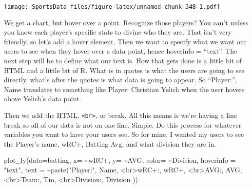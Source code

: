 \documentclass[
]{book}
\newenvironment{Shaded}{\begin{snugshade}}{\end{snugshade}}
\newcommand{\AttributeTok}[1]{\textcolor[rgb]{0.77,0.63,0.00}{#1}}
\newcommand{\FunctionTok}[1]{\textcolor[rgb]{0.00,0.00,0.00}{#1}}
\newcommand{\NormalTok}[1]{#1}
\newcommand{\SpecialCharTok}[1]{\textcolor[rgb]{0.00,0.00,0.00}{#1}}
\newcommand{\StringTok}[1]{\textcolor[rgb]{0.31,0.60,0.02}{#1}}
\begin{document}
\texttt{[image: SportsData\_files/figure-latex/unnamed-chunk-348-1.pdf]}

We get a chart, but hover over a point. Recognize those players? You can't unless you know each player's specific stats to divine who they are. That isn't very friendly, so let's add a hover element. Then we want to specify what we want our users to see when they hover over a data point, hence hoverinfo = ``text''. The next step will be to define what our text is. How that gets done is a little bit of HTML and a little bit of R. What is in quotes is what the users are going to see directly, what's after the quotes is what data is going to appear. So ``Player:'', Name translates to something like Player: Christian Yelich when the user hovers above Yelich's data point.

Then we add the HTML, \texttt{\textless{}br\textgreater{}}, or break. All this means is we're having a line break so all of our data is not on one line. Simple. Do this process for whatever variables you want to have your users see. So for mine, I wanted my users to see the Player's name, wRC+, Batting Avg, and what division they are in.

\begin{Shaded}
\begin{Highlighting}[]
\FunctionTok{plot\_ly}\NormalTok{(}\AttributeTok{data=}\NormalTok{batting, }\AttributeTok{x=} \SpecialCharTok{\textasciitilde{}}\StringTok{\textasciigrave{}}\AttributeTok{wRC+}\StringTok{\textasciigrave{}}\NormalTok{, }\AttributeTok{y=} \SpecialCharTok{\textasciitilde{}}\StringTok{\textasciigrave{}}\AttributeTok{AVG}\StringTok{\textasciigrave{}}\NormalTok{, }\AttributeTok{color=} \SpecialCharTok{\textasciitilde{}}\StringTok{\textasciigrave{}}\AttributeTok{Division}\StringTok{\textasciigrave{}}\NormalTok{,}
        \AttributeTok{hoverinfo =} \StringTok{"text"}\NormalTok{,}
        \AttributeTok{text =} \SpecialCharTok{\textasciitilde{}}\FunctionTok{paste}\NormalTok{(}\StringTok{"Player:"}\NormalTok{, Name,}
                      \StringTok{\textquotesingle{}\textless{}br\textgreater{}wRC+:\textquotesingle{}}\NormalTok{, }\StringTok{\textasciigrave{}}\AttributeTok{wRC+}\StringTok{\textasciigrave{}}\NormalTok{,}
                      \StringTok{\textquotesingle{}\textless{}br\textgreater{}AVG:\textquotesingle{}}\NormalTok{, AVG,}
                      \StringTok{\textquotesingle{}\textless{}br\textgreater{}Team:\textquotesingle{}}\NormalTok{, Tm,}
                      \StringTok{\textquotesingle{}\textless{}br\textgreater{}Division:\textquotesingle{}}\NormalTok{, Division}
\NormalTok{                      ))}
\end{Highlighting}
\end{Shaded}
\end{document}

